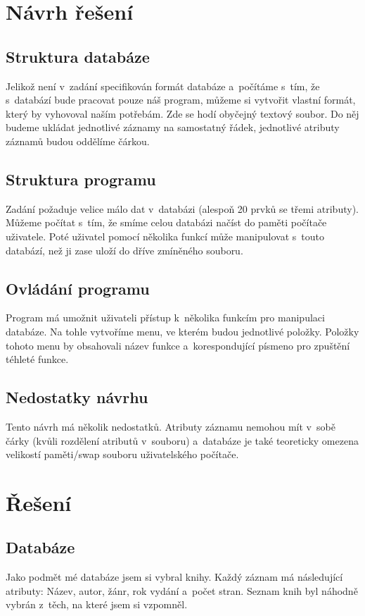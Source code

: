 \chapter{Návrh řešení}
\section{Struktura databáze}
Jelikož není v~zadání specifikován formát databáze a~počítáme s~tím, že s~databází 
bude pracovat pouze náš program, můžeme si vytvořit vlastní formát, který by vyhovoval naším potřebám. 
Zde se hodí obyčejný textový soubor. Do něj budeme ukládat jednotlivé záznamy 
na samostatný řádek, jednotlivé atributy záznamů budou oddělíme čárkou.
\section{Struktura programu}
Zadání požaduje velice málo dat v~databázi (alespoň 20 prvků se třemi atributy). 
Můžeme počítat s~tím, že smíme celou databázi načíst do paměti počítače uživatele. 
Poté uživatel pomocí několika funkcí může manipulovat s~touto databází, než ji zase uloží do dříve 
zmíněného souboru.
\section{Ovládání programu}
Program má umožnit uživateli přístup k~několika funkcím pro manipulaci databáze. 
Na tohle vytvoříme menu, ve kterém budou jednotlivé položky. Položky tohoto
menu by obsahovali název funkce a~korespondující písmeno pro zpuštění téhleté funkce.
\section{Nedostatky návrhu}
Tento návrh má několik nedostatků. Atributy záznamu nemohou mít v~sobě čárky (kvůli rozdělení atributů 
v~souboru) a~databáze je také teoreticky omezena velikostí paměti/swap souboru uživatelského počítače. 
\chapter{Řešení}
\section{Databáze}
Jako podmět mé databáze jsem si vybral knihy. Každý záznam má následující atributy: 
Název, autor, žánr, rok vydání a~počet stran. Seznam knih byl náhodně vybrán z~těch, na které 
jsem si vzpomněl.

